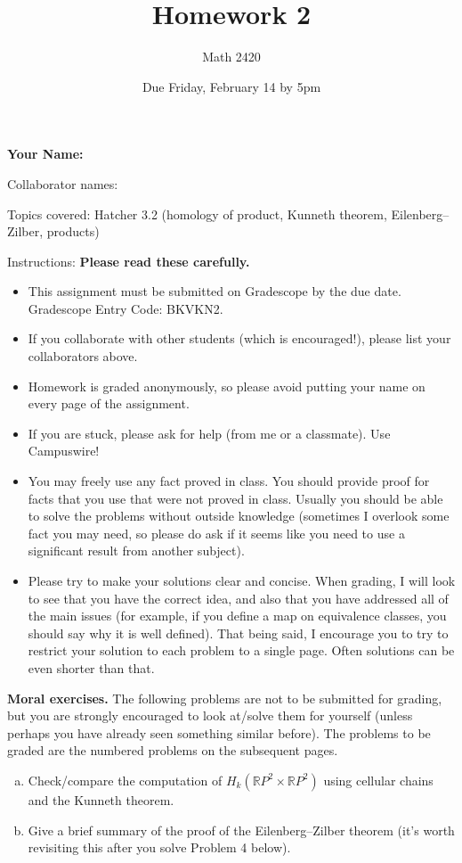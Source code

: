 \documentclass[11pt]{article}
\author{Math 2420}
\date{Due Friday, February 14 by 5pm}
\title{Homework 2}
\begin{document}
\maketitle

{\bf\Large Your Name:} 

Collaborator names: 


\vspace{.3in}
Topics covered: Hatcher 3.2 (homology of product, Kunneth theorem, Eilenberg--Zilber, products)

Instructions: {\bf Please read these carefully.} 
\begin{itemize}
\item This assignment must be submitted on Gradescope by the due date. Gradescope Entry Code: BKVKN2. 
\item If you collaborate with other students (which is encouraged!), please list your collaborators above. 
\item Homework is graded anonymously, so please avoid putting your name on every page of the assignment.
\item If you are stuck, please ask for help (from me or a classmate). Use Campuswire!  
\item You may freely use any fact proved in class. You should provide proof for facts that you use that were not proved in class. Usually you should be able to solve the problems without outside knowledge (sometimes I overlook some fact you may need, so please do ask if it seems like you need to use a significant result from another subject). 
\item Please try to make your solutions clear and concise. When grading, I will look to see that you have the correct idea, and also that you have addressed all of the main issues (for example, if you define a map on equivalence classes, you should say why it is well defined). That being said, I encourage you to try to restrict your solution to each problem to a single page. Often solutions can be even shorter than that. 
\end{itemize}
\pagebreak 




\pagebreak 



{\bf Moral exercises.} The following problems are not to be submitted for grading, but you are strongly encouraged to look at/solve them for yourself (unless perhaps you have already seen something similar before). The problems to be graded are the numbered problems on the subsequent pages.
\begin{enumerate}[(a)]
\item Check/compare the computation of $H_k(\mathbb RP^2\times \mathbb RP^2)$ using cellular chains and the Kunneth theorem. 
\item Give a brief summary of the proof of the Eilenberg--Zilber theorem (it's worth revisiting this after you solve Problem 4 below). 
\end{enumerate}
\end{document}
